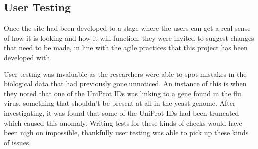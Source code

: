 \subsection{User Testing}
Once the site had been developed to a stage where the users can get a real sense of how it is looking and how it will function, they were invited to suggest changes that need to be made, in line with the agile practices that this project has been developed with. 

User testing was invaluable as the researchers were able to spot mistakes in the biological data that had previously gone unnoticed. An instance of this is when they noted that one of the UniProt IDs was linking to a gene found in the flu virus, something that shouldn't be present at all in the yeast genome. After investigating, it was found that some of the UniProt IDs had been truncated which caused this anomaly. Writing tests for these kinds of checks would have been nigh on impossible, thankfully user testing was able to pick up these kinds of issues. 
